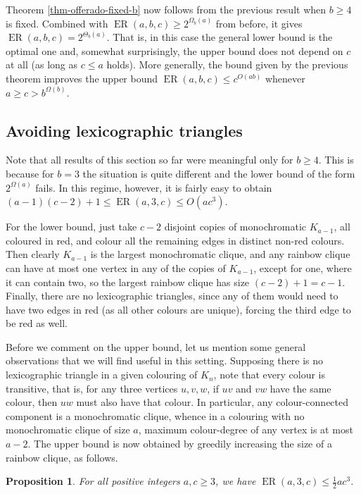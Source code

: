 \documentclass[11pt]{article}
\theoremstyle{plain}
\newtheorem{proposition}[theorem]{Proposition}
\theoremstyle{definition}
\newcommand{\offerado}[3]{\operatorname{ER}(#1,#2,#3)}
\begin{document}
Theorem \ref{thm-offerado-fixed-b} now follows from the previous result when $b\ge 4$ is fixed. Combined with $\offerado{a}{b}{c} \ge 2^{\Omega_b(a)}$ from before, it gives $\offerado abc = 2^{\Theta_b(a)}$. That is, in this case the general lower bound is the optimal one and, somewhat surprisingly, the upper bound does not depend on $c$ at all (as long as $c\le a$ holds). More generally, the bound given by the previous theorem improves the upper bound $\offerado{a}{b}{c}\le c^{O(ab)}$ whenever $a\ge c>b^{\Omega(b)}$.

\subsection{Avoiding lexicographic triangles}\label{subsec-avoiding-lex-triang}

Note that all results of this section so far were meaningful only for $b\ge 4$. This is because for $b=3$ the situation is quite different and the lower bound of the form $2^{\Omega(a)}$ fails. In this regime, however, it is fairly easy to obtain $(a-1)(c-2)+1\le \offerado{a}{3}{c}\le O(ac^3)$.

For the lower bound, just take $c-2$ disjoint copies of monochromatic $K_{a-1}$, all coloured in red, and colour all the remaining edges in distinct non-red colours. Then clearly $K_{a-1}$ is the largest monochromatic clique, and any rainbow clique can have at most one vertex in any of the copies of $K_{a-1}$, except for one, where it can contain two, so the largest rainbow clique has size $(c-2)+1=c-1$. Finally, there are no lexicographic triangles, since any of them would need to have two edges in red (as all other colours are unique), forcing the third edge to be red as well.

Before we comment on the upper bound, let us mention some general observations that we will find useful in this setting. Supposing there is no lexicographic triangle in a given colouring of $K_n$, note that every colour is transitive, that is, for any three vertices $u,v,w$, if $uv$ and $vw$ have the same colour, then $uw$ must also have that colour. In particular, any colour-connected component is a monochromatic clique, whence in a colouring with no monochromatic clique of size $a$, maximum colour-degree of any vertex is at most $a-2$. The upper bound is now obtained by greedily increasing the size of a rainbow clique, as follows.

\begin{proposition}\label{prop-upper-b3-greedy}
    For all positive integers $a,c\ge 3$, we have $\offerado{a}{3}{c}\le\frac{1}{2}ac^3$.
\end{proposition}
\end{document}
